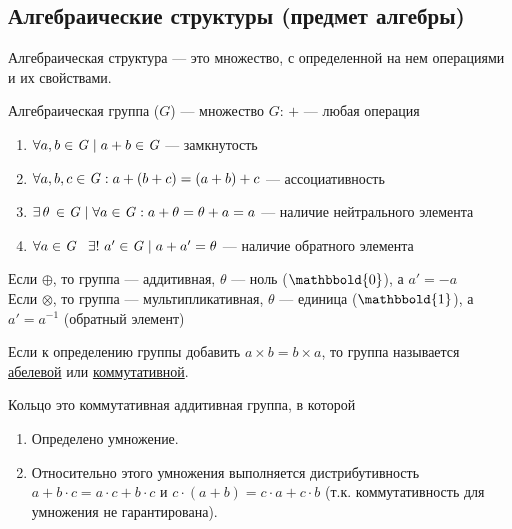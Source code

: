 \subsection{%
  Алгебраические структуры (предмет алгебры)%
}
\begin{definition}
	Алгебраическая структура --- это множество,
	с определенной на нем операциями и их свойствами.
\end{definition}
\begin{definition}\label{def:group}
	Алгебраическая группа ($G$) --- множество $G$: \underline{$+$} --- любая операция
	\begin{enumerate}[topsep=5pt]
		\item \(\forall a, b \in \mathit{G} \mid a + b \in \mathit{G}\) --- замкнутость
		\item $\forall a,b,c \in \mathit{G}: a + (b + c) = (a + b) + c$ --- ассоциативность
		\item $\exists \, \theta \, \in \mathit{G} \mid \forall a \in \mathit{G}: a + \theta = \theta + a = a$ --- наличие нейтрального элемента
		\item $\forall a \in \mathit{G} \hspace{0.8em} \exists!\, \, a' \in \mathit{G} \mid a + a' = \theta$ --- наличие обратного элемента
	\end{enumerate}
\end{definition}
\begin{nota}
	Если $\oplus$, то группа --- аддитивная, $\theta$ --- ноль ($\mathbbold{0}$), а $a' = -a$\\[1mm]
	\hspace*{7.6em} Если $\otimes$, то группа --- мультипликативная, $\theta$ --- единица ($\mathbbold{1}$), а $a' = a^{-1}$ (обратный элемент)\\[1mm]
	\noindent{}
\end{nota}
\begin{nota}
	Если к определению группы добавить $a \times b = b \times a$,
	то группа называется \underline{абелевой} или \underline{коммутативной}.
\end{nota}
\begin{definition}
  Кольцо это коммутативная аддитивная группа, в которой
  \begin{enumerate}[topsep=5pt]
  \item
    Определено умножение.
  \item
    Относительно этого умножения выполняется дистрибутивность\\ \(a + b \cdot c =
    a \cdot c + b \cdot c\) и \(c \cdot (a + b) = c \cdot a + c \cdot b\) (т.к.
    коммутативность для умножения не гарантирована).
  \end{enumerate}
\end{definition}


